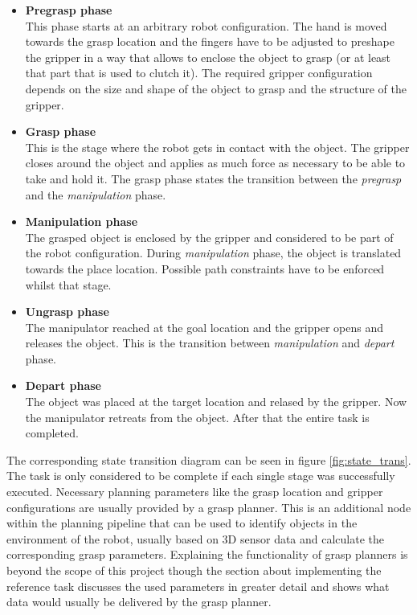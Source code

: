 \begin{itemize}

\item \textbf{Pregrasp phase} \\

This phase starts at an arbitrary robot configuration. The hand is moved towards the grasp location and the fingers have to be adjusted to preshape the gripper in a way that allows to enclose the object to grasp (or at least that part that is used to clutch it). The required gripper configuration depends on the size and shape of the object to grasp and the structure of the gripper.

\item \textbf{Grasp phase} \\

This is the stage where the robot gets in contact with the object. The gripper closes around the object and applies as much force as necessary to be able to take and hold it. The grasp phase states the transition between the \emph{pregrasp} and the \emph{manipulation} phase.

\item \textbf{Manipulation phase} \\

The grasped object is enclosed by the gripper and considered to be part of the robot configuration. 
During \emph{manipulation} phase, the object is translated towards the place location. Possible path constraints have to be enforced whilst that stage.

\item \textbf{Ungrasp phase} \\

The manipulator reached at the goal location and the gripper opens and releases the object. This is the transition between \emph{manipulation} and \emph{depart} phase.

\item \textbf{Depart phase} \\

The object was placed at the target location and relased by the gripper. Now the manipulator retreats from the object. After that the entire task is completed.

\end{itemize}

The corresponding state transition diagram can be seen in figure \ref{fig:state_trans}. The task is only considered to be complete if each single stage was successfully executed. Necessary planning parameters like the grasp location and gripper configurations are usually provided by a grasp planner. This is an additional node within the planning pipeline that can be used to identify objects in the environment of the robot, usually based on 3D sensor data and calculate the corresponding grasp parameters. Explaining the functionality of grasp planners is beyond the scope of this project though the section about implementing the reference task discusses the used parameters in greater detail and shows what data would usually be delivered by the grasp planner. \\

